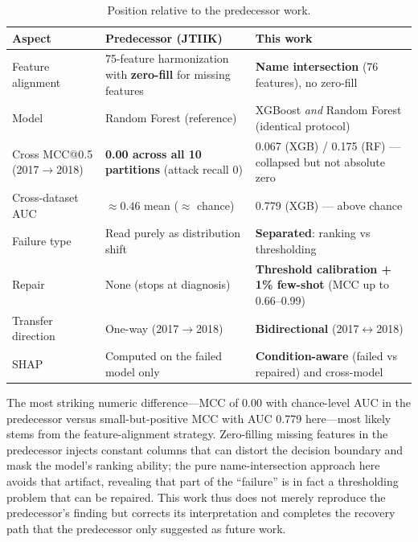 \documentclass[11pt,a4paper]{article}
\begin{document}
\begin{table}[htbp]
\centering
\caption{Position relative to the predecessor work.}
\label{tab:predecessor}
\footnotesize
\begin{tabular}{p{3.2cm}p{4.3cm}p{4.3cm}}
\toprule
Aspect & Predecessor (JTIIK) & This work \\
\midrule
Feature alignment & 75-feature harmonization with \textbf{zero-fill} for missing features & \textbf{Name intersection} (76 features), no zero-fill \\
Model & Random Forest (reference) & XGBoost \emph{and} Random Forest (identical protocol) \\
Cross MCC@0.5 (2017$\rightarrow$2018) & \textbf{0.00 across all 10 partitions} (attack recall 0) & 0.067 (XGB) / 0.175 (RF) --- collapsed but not absolute zero \\
Cross-dataset AUC & $\approx 0.46$ mean ($\approx$ chance) & 0.779 (XGB) --- above chance \\
Failure type & Read purely as distribution shift & \textbf{Separated}: ranking vs thresholding \\
Repair & None (stops at diagnosis) & \textbf{Threshold calibration + 1\% few-shot} (MCC up to 0.66--0.99) \\
Transfer direction & One-way (2017$\rightarrow$2018) & \textbf{Bidirectional} (2017$\leftrightarrow$2018) \\
SHAP & Computed on the failed model only & \textbf{Condition-aware} (failed vs repaired) and cross-model \\
\bottomrule
\end{tabular}
\end{table}

The most striking numeric difference---MCC of 0.00 with chance-level AUC in the predecessor
versus small-but-positive MCC with AUC 0.779 here---most likely stems from the
feature-alignment strategy. Zero-filling missing features in the predecessor injects
constant columns that can distort the decision boundary and mask the model's ranking
ability; the pure name-intersection approach here avoids that artifact, revealing that part
of the ``failure'' is in fact a thresholding problem that can be repaired. This work thus
does not merely reproduce the predecessor's finding but corrects its interpretation and
completes the recovery path that the predecessor only suggested as future work.
\end{document}
